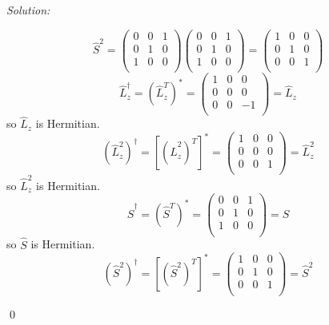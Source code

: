 \documentclass[12pt,a4paper]{article}
\newenvironment{sol}
    {\emph{Solution:}
    }
    {
    \qed
    }
\begin{document}
\begin{sol}
\begin{itemize}
\begin{equation}
\hat{S}^2=\left(\begin{array}{ccc}
0&0&1\\
0&1&0\\
1&0&0\\
\end{array}\right)\left(\begin{array}{ccc}
0&0&1\\
0&1&0\\
1&0&0\\
\end{array}\right)=\left(\begin{array}{ccc}
1&0&0\\
0&1&0\\
0&0&1\\
\end{array}\right)
\end{equation}
\begin{equation}
\hat{L}_z^{\dagger}=(\hat{L}_z^T)^*=\left(\begin{array}{ccc}
1&0&0\\
0&0&0\\
0&0&-1\\
\end{array}\right)=\hat{L}_z
\end{equation}
so $\hat{L}_z$ is Hermitian.
\begin{equation}
(\hat{L}_z^2)^{\dagger}=[(\hat{L}_z^2)^T]^*=\left(\begin{array}{ccc}
1&0&0\\
0&0&0\\
0&0&1\\
\end{array}\right)=\hat{L}_z^2
\end{equation}
so $\hat{L}_z^2$ is Hermitian.
\begin{equation}
\hat{S}^{\dagger}=(\hat{S}^T)^*=\left(\begin{array}{ccc}
0&0&1\\
0&1&0\\
1&0&0\\
\end{array}\right)=\hat{S}
\end{equation}
so $\hat{S}$ is Hermitian.
\begin{equation}
(\hat{S}^2)^{\dagger}=[(\hat{S}^2)^T]^*=\left(\begin{array}{ccc}
1&0&0\\
0&1&0\\
0&0&1\\
\end{array}\right)=\hat{S}^2

\end{equation}
\end{itemize}
\end{sol}
\end{document}
